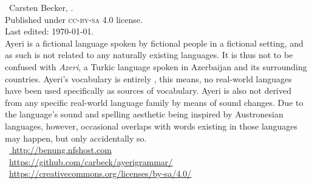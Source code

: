 

\begin{minipage}[b][\textheight][b]{0.67\textwidth}\small
\ccbysa~Carsten Becker, \the\year.\\
Published under \textsc{cc-by-sa} 4.0 license.\\
Last edited: \today{}.\\[.5\baselineskip]


Ayeri is a fictional language spoken by fictional people in a fictional setting, 
and as such is not related to any naturally existing languages. It is thus not 
to be confused with \emph{Azeri}, a Turkic language spoken in Azerbaijan and its 
surrounding countries. Ayeri’s vocabulary is entirely , this 
means, no real-world languages have been used specifically as sources of 
vocabulary. Ayeri is also not derived from any specific real-world language 
family by means of sound changes. Due to the language’s sound and spelling 
aesthetic being inspired by Austronesian languages, however, occasional 
overlaps with words existing in those languages may happen, but only  
accidentally so.\\[.5\baselineskip]

~\href{http://benung.nfshost.com}{%
http://benung.nfshost.com}\\
%
~\href{https://github.com/carbeck/ayerigrammar}
{https://github.com/carbeck/ayerigrammar/}\\
%
~\href{%
https://creativecommons.org/licenses/by-sa/4.0/}%
{https://creativecommons.org/licenses/by-sa/4.0/}%

\end{minipage}
